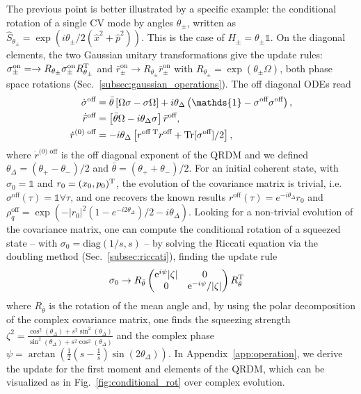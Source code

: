 \documentclass[%
reprint,
superscriptaddress,
nofootinbib,
 amsmath,amssymb,
prx,
floatfix,
]{revtex4-2}
\begin{document}
The previous point is better illustrated by a specific example: the conditional rotation of a single CV mode by angles $\theta_{\pm}$, written as $\hat{S}_{\theta_\pm}  = \exp ( i \theta_\pm/2 (\hat{x}^2 + \hat{p}^2))$. This is the case of $H_{\pm} = \theta_{\pm} \mathds{1} $. On the diagonal elements, the two Gaussian unitary transformations give the update rules: $\sigma^{\text{on}}_\pm = \to R_{\theta_\pm}\sigma^{\text{on}}_\pm  R_{\theta_\pm}^{\rm T}$ and  $\bar{r}^{\text{on}}_\pm  \to  R_{\theta_\pm} \bar{r}^{\text{on}}_\pm $ with $R_{\theta_\pm} = \exp(\theta_\pm \Omega)$, both phase space rotations (Sec.~\ref{subsec:gaussian_operations}). The off diagonal ODEs read
\begin{align}
\label{eq:ODE_conditional_rot}
    \dot{\sigma}^{\text{off}} &= \bar{\theta} \left[\Omega \sigma - \sigma \Omega \right] + i \theta_{\Delta} \left( \mathds{1} - \sigma^{\text{off}} \sigma^{\text{off}} \right) ,\nonumber \\ 
    \dot{\bar{r}}^{\text{off}} &= \left[ \bar{\theta} \Omega -  i \theta_{\Delta} \sigma \right]\bar{r}^{\text{off}} , \\ 
    \dot{r}^{\text{(0) off}} & = - i \theta_{\Delta} \left[ {r}^{\text{off} \; \rm T}{r}^{\text{off}} +  \text{Tr}[\sigma^{\text{off}} ]/2\right] , \nonumber
\end{align}
where $\dot{r}^{\text{(0) off}}$ is the off diagonal exponent of the QRDM and we defined $\theta_{\Delta} = (\theta_+ - \theta_-)/2$ and $\bar{ \theta} = (\theta_+ + \theta_-)/2$. For an initial coherent state, with $\sigma_0 = \mathds{1}$ and $r_0 = (x_0 , p_0)^{\rm T}$, the evolution of the covariance matrix is trivial, i.e. $\sigma^{\text{off}} (\tau) = \mathds{1} \forall \tau$, and one recovers the known results  $r^{\text{off}} (\tau) = e^{-i \theta_\Delta } r_0$ and $\rho_q^{\text{off}} = \exp \left(  - |r_0|^2 \left( 1 - e^{-i 2 \theta_\Delta} \right)/2 -  i \theta_\Delta \right)$. Looking for a non-trivial evolution of the covariance matrix, one can compute the conditional rotation of a squeezed state -- with $\sigma_0 = \text{diag} (1/s, s)$ -- by solving the Riccati equation via the doubling method (Sec.~\ref{subsec:riccati}), finding the update rule
\begin{align}
\label{eq:cov_rotation}
     \sigma_0 &\to    R_{\bar{\theta}} \begin{pmatrix}
 {\rm e}^{i \psi} |\zeta | & 0 \\
 0 &  {\rm e}^{-i \psi}/|\zeta|
    \end{pmatrix} R_{\bar{\theta}}^{\rm T}  
\end{align}
where $ R_{\bar{\theta}}$ is the rotation of the mean angle and, by using the polar decomposition of the complex covariance matrix, one finds the squeezing strength $\zeta^2 = 
 \frac{\cos ^2(\theta_{\Delta} )+s^2 \sin ^2(\theta_{\Delta} )}{\sin ^2(\theta_{\Delta} )+s^2 \cos ^2(\theta_{\Delta} )} $ and the complex phase $\psi = \arctan \left( \frac{1}{2} (s -\frac{1}{s}) \sin(2 \theta_\Delta) \right) $.  In Appendix~\ref{app:operation}, we derive the update for the first moment and elements of the QRDM, which can be visualized as in  Fig.~\ref{fig:conditional_rot} over complex evolution.
\end{document}
